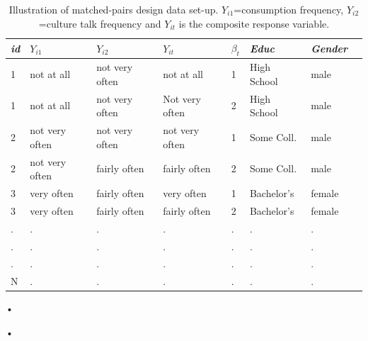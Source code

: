 \begin{table}[ht!]
\begin{tabular}{l l l l l l l l }
	\hline
	\emph{id}&$Y_{i1}$&$Y_{i2}$&$Y_{it}$&$\beta_t$&\emph{Educ}&\emph{Gender}\\
	\hline
	\hline
	1&not at all&not very often&not at all&1&High School&male\\
	1&not at all&not very often&Not very often&2&High School&male\\
	2&not very often&not very often&not very often&1&Some Coll.&male\\
	2&not very often&fairly often&fairly often&2&Some Coll.&male\\
	3&very often&fairly often&very often&1&Bachelor's&female\\
	3&very often&fairly often&fairly often&2&Bachelor's&female\\
	.&.&.&.&.&.&.&\\
	.&.&.&.&.&.&.&\\
	.&.&.&.&.&.&.&\\
	N&.&.&.&.&.&.&\\
	\hline
\end{tabular}•
\caption{Illustration of matched-pairs design data set-up.  $Y_{i1}$=consumption frequency, $Y_{i2}$=culture talk frequency and $Y_{it}$ is the composite response variable.}
\end{table}•